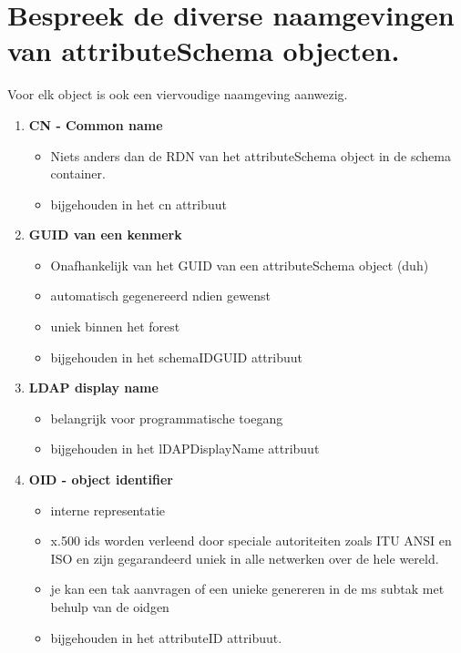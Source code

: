 \section{Bespreek de diverse naamgevingen van attributeSchema objecten.}

Voor elk object is ook een viervoudige naamgeving aanwezig.
\begin{enumerate}
\item \textbf{CN - Common name}
\begin{itemize}
\item Niets anders dan de RDN van het attributeSchema object in de schema container.
\item bijgehouden in het cn attribuut
\end{itemize}

\item \textbf{GUID van een kenmerk}
\begin{itemize}
\item Onafhankelijk van het GUID van een attributeSchema object (duh)
\item automatisch gegenereerd ndien gewenst
\item uniek binnen het forest
\item bijgehouden in het schemaIDGUID attribuut
\end{itemize}

\item \textbf{LDAP display name}
\begin{itemize}
\item belangrijk voor programmatische toegang
\item bijgehouden in het lDAPDisplayName attribuut
\end{itemize}

\item \textbf{OID - object identifier}
\begin{itemize}
\item interne representatie
\item x.500 ids worden verleend door speciale autoriteiten zoals ITU ANSI en ISO en zijn gegarandeerd uniek in alle netwerken over de hele wereld.
\item je kan een tak aanvragen of een unieke genereren in de ms subtak met behulp van de oidgen
\item bijgehouden in het attributeID attribuut.
\end{itemize}
\end{enumerate}

